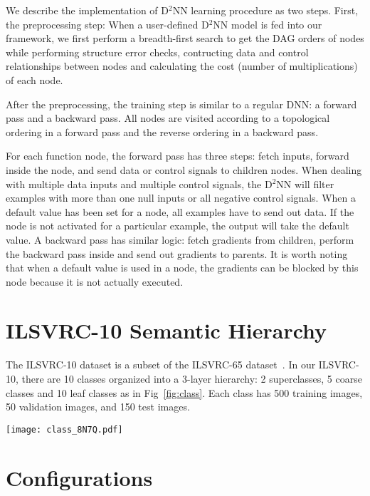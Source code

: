 \documentclass[10pt,twocolumn,letterpaper]{article}
\begin{document}
   We describe the implementation of D$^2$NN learning procedure as two steps.
   First, the preprocessing step:
   When a user-defined D$^2$NN model is fed into our framework, we first
   perform a breadth-first search to get the DAG orders of nodes
   while performing structure error checks, contructing data and control
   relationships between nodes and calculating the cost (number of multiplications) of each node.
  
   After the preprocessing, the training step is similar to a regular DNN: a forward pass and a backward pass.
   All nodes are visited according to a topological ordering in a forward pass and the reverse ordering in a backward pass.
 
   For each function node, the forward pass has three steps: fetch inputs, forward inside the node, and
   send data or control signals to children nodes. When dealing with multiple data
   inputs and multiple control signals, the D$^2$NN will filter examples with more than one null inputs or
   all negative control signals. When a default value has been set for a node, all examples have to send out data. If the node is not activated for a particular example, the output will take the default value.
   A backward pass has similar logic: fetch gradients from children, perform the backward pass inside and
   send out gradients to parents. It is worth noting that when a default value is used in a node, the gradients
   can be blocked by this node because it is not actually executed.
  
\section{ILSVRC-10 Semantic Hierarchy}

The ILSVRC-10 dataset is a subset of the ILSVRC-65 dataset~\cite{deng2012hedging}. In our
ILSVRC-10, there are 10 classes organized into a 3-layer hierarchy: 2 superclasses,
5 coarse classes and 10 leaf classes as in Fig~\ref{fig:class}.
Each class has 500 training images, 50 validation images, and 150 test images. 

\begin{figure*}[t] \centering
\texttt{[image: class\_8N7Q.pdf]}
\caption{The semantic class hierarchy of the ILSVRC-10 dataset.}
\label{fig:class}
\end{figure*}

  
\section{Configurations}  
\end{document}
